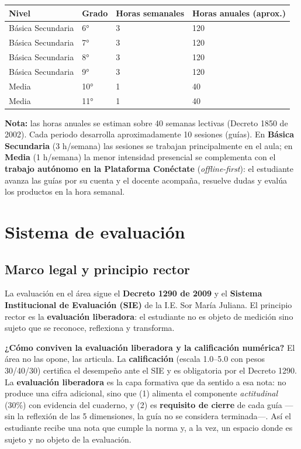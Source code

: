 \documentclass[12pt, a4paper]{article}
\begin{document}
\begin{center}
\begin{tabular}{|L{3.5cm}|L{2cm}|L{3cm}|L{4cm}|}
\hline
{}
\color{white}\textbf{Nivel} &
\color{white}\textbf{Grado} &
\color{white}\textbf{Horas semanales} &
\color{white}\textbf{Horas anuales (aprox.)} \\
\hline
Básica Secundaria & 6° & 3 & 120 \\
\hline
Básica Secundaria & 7° & 3 & 120 \\
\hline
Básica Secundaria & 8° & 3 & 120 \\
\hline
Básica Secundaria & 9° & 3 & 120 \\
\hline
Media & 10° & 1 & 40 \\
\hline
Media & 11° & 1 & 40 \\
\hline
\end{tabular}
\end{center}

\textbf{Nota:} las horas anuales se estiman sobre 40 semanas lectivas (Decreto 1850
de 2002). Cada periodo desarrolla aproximadamente 10 sesiones (guías). En
\textbf{Básica Secundaria} (3 h/semana) las sesiones se trabajan principalmente en
el aula; en \textbf{Media} (1 h/semana) la menor intensidad presencial se
complementa con el \textbf{trabajo autónomo en la Plataforma Conéctate}
(\textit{offline-first}): el estudiante avanza las guías por su cuenta y el docente
acompaña, resuelve dudas y evalúa los productos en la hora semanal.

\section{Sistema de evaluación}

\subsection{Marco legal y principio rector}

La evaluación en el área sigue el \textbf{Decreto 1290 de 2009} y el
\textbf{Sistema Institucional de Evaluación (SIE)} de la I.E. Sor María Juliana.
El principio rector es la \textbf{evaluación liberadora}: el estudiante no es
objeto de medición sino sujeto que se reconoce, reflexiona y transforma.

\textbf{¿Cómo conviven la evaluación liberadora y la calificación numérica?} El
área no las opone, las articula. La \textbf{calificación} (escala 1.0–5.0 con
pesos 30/40/30) certifica el desempeño ante el SIE y es obligatoria por el
Decreto 1290. La \textbf{evaluación liberadora} es la capa formativa que da
sentido a esa nota: no produce una cifra adicional, sino que (1) alimenta el
componente \textit{actitudinal} (30\%) con evidencia del cuaderno, y (2) es
\textbf{requisito de cierre} de cada guía —sin la reflexión de las 5 dimensiones,
la guía no se considera terminada—. Así el estudiante recibe una nota que cumple
la norma y, a la vez, un espacio donde es sujeto y no objeto de la evaluación.
\end{document}

